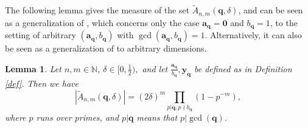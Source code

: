 \documentclass[reqno]{amsart}
\newtheorem{lemma}{Lemma}
\theoremstyle{definition}
\theoremstyle{remark}
\begin{document}
The following lemma gives the measure of the set $\tilde{A}_{n,m}(\mathbf{q}, \delta)$, and can be seen as a generalization of \cite[Lemma 7]{BV09}, which concerns only the case $\mathbf{a}_\mathbf{q} = \mathbf{0}$ and $b_\mathbf{q}=1$, to the setting of arbitrary $(\mathbf{a}_\mathbf{q}, b_\mathbf{q})$ with $\gcd(\mathbf{a}_\mathbf{q}, b_\mathbf{q}) = 1$. Alternatively, it can also be seen as a generalization of \cite[Proposition 1]{BHV24} to arbitrary dimensions.

\begin{lemma}\label{measure}
    Let $n,m \in \mathbb{N}$, $\delta \in [0,\frac{1}{2}),$ and let $\frac{\mathbf{a}_\mathbf{q}}{b_\mathbf{q}}, \mathbf{y}_\mathbf{q}$ be defined as in Definition \ref{def}. Then we have
    $$|\tilde{A}_{n,m}(\mathbf{q},\delta)| = (2\delta)^m \prod_{p|\mathbf{q}, p \nmid b_{\mathbf{q}}}(1-p^{-m}),$$
    where $p$ runs over primes, and $p|\mathbf{q}$ means that $p|\gcd(\mathbf{q})$.
\end{lemma}
\end{document}
